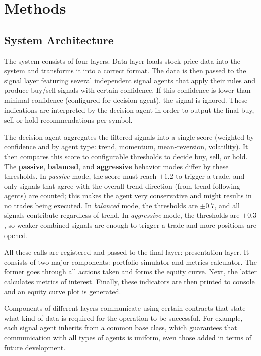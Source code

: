 \documentclass{icis}
\begin{document}
\section{Methods}

\subsection{System Architecture}

The system consists of four layers. Data layer loads stock price data into the system and transforms it into a correct format. The data is then passed to the signal layer featuring several independent signal agents that apply their rules and produce buy/sell signals with certain confidence. If this confidence is lower than minimal confidence (configured for decision agent), the signal is ignored. These indications are interpreted by the decision agent in order to output the final buy, sell or hold recommendations per symbol.  

The decision agent aggregates the filtered signals into a single score (weighted by confidence and by agent type: trend, momentum, mean-reversion, volatility). It then compares this score to configurable thresholds to decide buy, sell, or hold. The \textbf{passive}, \textbf{balanced}, and \textbf{aggressive} behavior modes differ by these thresholds. In \emph{passive} mode, the score must reach $\pm 1.2$ to trigger a trade, and only signals that agree with the overall trend direction (from trend-following agents) are counted; this makes the agent very conservative and might results in no trades being executed. In \emph{balanced} mode, the thresholds are $\pm 0.7$, and all signals contribute regardless of trend. In \emph{aggressive} mode, the thresholds are $\pm 0.3$, so weaker combined signals are enough to trigger a trade and more positions are opened.

All these calls are registered and passed to the final layer: presentation layer. It consists of two major components: portfolio simulator and metrics calculator. The former goes through all actions taken and forms the equity curve. Next, the latter calculates metrics of interest. Finally, these indicators are then printed to console and an equity curve plot is generated.

Components of different layers communicate using certain contracts that state what kind of data is required for the operation to be successful. For example, each signal agent inherits from a common base class, which guarantees that communication with all types of agents is uniform, even those added in terms of future development.
\end{document}
